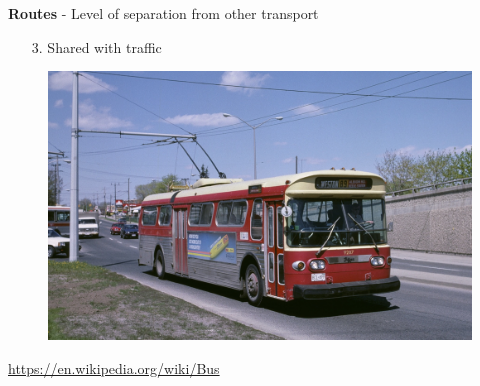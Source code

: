 \documentclass[aspectratio=169]{beamer}
\begin{document}
\begin{frame}
	
	\textbf{Routes} - Level of separation from other transport
	
	
	\begin{itemize}
		
		\item[3.] Shared with traffic
		
		
	\end{itemize}
	
	\begin{figure}
		\centering
		\includegraphics[width=0.77\linewidth]{images/trolleybus.jpg}
	\end{figure}
	
	\tiny\url{https://en.wikipedia.org/wiki/Bus}
	
	
\end{frame}
\end{document}
